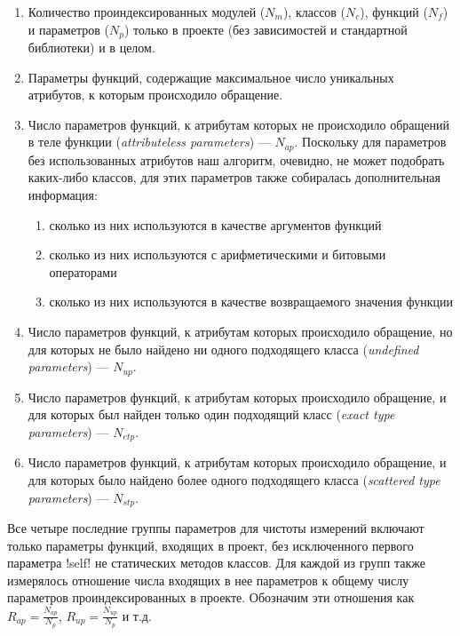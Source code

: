 \begin{enumerate}
  \item Количество проиндексированных модулей ($N_m$), классов ($N_c$), функций
    ($N_f$) и параметров ($N_p$) только в проекте (без зависимостей и
    стандартной библиотеки) и в целом.

  \item Параметры функций, содержащие максимальное число уникальных атрибутов, к
    которым происходило обращение.

  \item Число параметров функций, к атрибутам которых не происходило обращений в
    теле функции (\emph{attributeless parameters}) --- $N_{ap}$.
    Поскольку для параметров без использованных атрибутов наш алгоритм,
    очевидно, не может подобрать каких-либо классов, для этих параметров также
    собиралась дополнительная информация:
    
    \begin{enumerate}
        \item сколько из них используются в качестве аргументов функций
        \item сколько из них используются с арифметическими и битовыми операторами
        \item сколько из них используются в качестве возвращаемого значения функции
    \end{enumerate}

  \item Число параметров функций, к атрибутам которых происходило обращение, но для
    которых не было найдено ни одного подходящего класса (\emph{undefined
      parameters}) --- $N_{up}$.

  \item Число параметров функций, к атрибутам которых происходило обращение, и для
    которых был найден только один подходящий класс (\emph{exact type parameters}) 
    --- $N_{etp}$.

  \item Число параметров функций, к атрибутам которых происходило обращение, и для
    которых было найдено более одного подходящего класса (\emph{scattered type
      parameters}) --- $N_{stp}$.

\end{enumerate}

Все четыре последние группы параметров для чистоты измерений включают только
параметры функций, входящих в проект, без исключенного первого параметра !self!
не статических методов классов. Для каждой из групп также измерялось
отношение числа входящих в нее параметров к общему числу параметров
проиндексированных в проекте.
Обозначим эти отношения как $R_{ap} = \frac{N_{ap}}{N_p}$, $R_{up} =
\frac{N_{up}}{N_p}$ и т.д.

